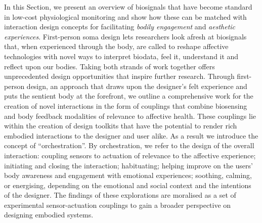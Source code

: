 In this Section, we present an overview of biosignals that have become standard in low-cost physiological monitoring and show how these can be matched with interaction design concepts for facilitating \textit{bodily engagement} and \textit{aesthetic experiences}. First-person soma design lets researchers look afresh at biosignals that, when experienced through the body, are called to reshape affective technologies with novel ways to interpret biodata, feel it, understand it and reflect upon our bodies. Taking both strands of work together offers unprecedented design opportunities that inspire further research. Through first-person design, an approach that draws upon the designer’s felt experience and puts the sentient body at the forefront, we outline a comprehensive work for the creation of novel interactions in the form of couplings that combine biosensing and body feedback modalities of relevance to affective health. These couplings lie within the creation of design toolkits that have the potential to render rich embodied interactions to the designer and user alike. As a result we introduce the concept of “orchestration”. By orchestration, we refer to the design of the overall interaction: coupling sensors to actuation of relevance to the affective experience; initiating and closing the interaction; habituating; helping improve on the users’ body awareness and engagement with emotional experiences; soothing, calming, or energising, depending on the emotional and social context and the intentions of the designer. The findings of these explorations are moralised as a set of experimental sensor-actuation couplings to gain a broader perspective on designing embodied systems.

